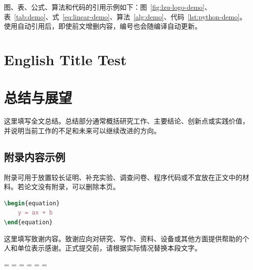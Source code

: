 \documentclass[AutoFakeBold]{LZUThesis_xb}
\begin{document}
图、表、公式、算法和代码的引用示例如下：图~\ref{fig:lzu-logo-demo}、表~\ref{tab:demo}、式~\eqref{eq:linear-demo}、算法~\ref{alg:demo}、代码~\ref{lst:python-demo}。使用自动引用后，即使前文增删内容，编号也会随编译自动更新。

\chapter{English Title Test}
\chapter{总结与展望}

这里填写全文总结。总结部分通常概括研究工作、主要结论、创新点或实践价值，并说明当前工作的不足和未来可以继续改进的方向。

\backmatter

\printbib

\Appendix

\section{附录内容示例}

附录可用于放置较长证明、补充实验、调查问卷、程序代码或不宜放在正文中的材料。若论文没有附录，可以删除本页。

\begin{lstlisting}[language=TeX, caption={TeX 片段示例}]
\begin{equation}
    y = ax + b
\end{equation}
\end{lstlisting}

\Thanks

这里填写致谢内容。致谢应向对研究、写作、资料、设备或其他方面提供帮助的个人和单位表示感谢。正式提交前，请根据实际情况替换本段文字。


\supervisorcomment={}           %
\recommendedgrade={}            %
\supervisorsignature={}
\committeecomment={}            %
\committeesignature={}          %
\finalgrade={}                  %
\Grade

\end{document}
